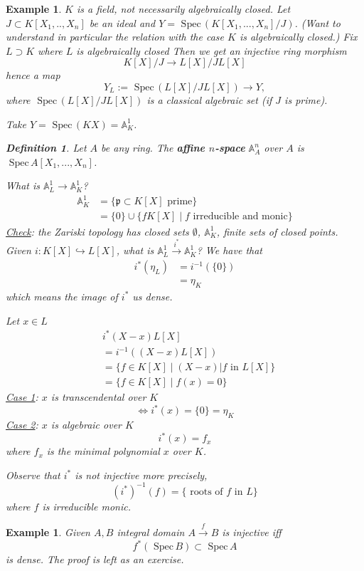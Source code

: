 \documentclass[11pt]{article}
\newtheorem{dfn}[thm]{Definition}
\newtheorem{ex}[thm]{Example}
\newcommand{\spec}{\text{ Spec}\,}
\newcommand{\affn}{\mathbb A}
\newcommand{\scp}{{\mathfrak p}}
\newcommand{\lrta}{\longrightarrow}
\newcommand{\Llrta}{\Longleftrightarrow}
\newcommand{\inj}{\hookrightarrow}
\begin{document}
\begin{ex}
$K$ is a field, not necessarily algebraically closed. Let $J\subset K[X_1,..,X_n]$ be an ideal and $Y=\spec (K[X_1,...,X_n]/J)$. (Want to understand in particular the relation with the case $K$ is algebraically closed.) Fix $L \supset K$  where $L$  is algebraically closed Then we get an injective ring morphism 
$$
K[X]/J\lrta L[X]/JL[X]
$$
hence a map
$$
Y_L:=\spec(L[X]/JL[X])\lrta Y,
$$
where $\spec(L[X]/JL[X])$ is a classical algebraic set (if $J$ is prime).

Take
$Y=\spec (K{X})=\affn^1_K$.

\begin{dfn}
	Let $A$ be any ring. The \textbf{affine $n$-space} $\affn^n_A$ over $A$ is $\spec A[X_1,...,X_n]$.
\end{dfn}
	
	


What is $\affn^1_L\lrta \affn^1_K$?
$$
\begin{aligned}
\affn^1_K&=\{\scp\subset K[X]\text{ prime}\}\\
&=\{0\} \cup \{fK[X]\mid f \text{ irreducible and monic}\}
\end{aligned}
$$
\underline{Check}: the Zariski topology has  closed sets $\emptyset$, $\affn^1_K$, finite sets of closed points. Given $i: K[X]\inj L[X]$, what is 
$\affn^1_L\overset{i^*}{\lrta }\affn^1_K$? We have that
$$
\begin{aligned}
i^*(\eta_L)&=i^{-1}(\{0\})\\
&= \eta_K
\end{aligned}
$$
which means the image of $i^*$ us dense.

Let $x\in L$
$$\begin{aligned}
&i^*(X-x)L[X]\\
&=i^{-1}((X-x)L[X])\\
&=\{f\in K[X]\mid (X-x)|f\text{ in } L[X]\}\\
&=\{f\in K[X]\mid f(x)=0\}
\end{aligned}
$$
\underline{Case 1}: $x$ is transcendental over $K$ 
$$
\Llrta i^*(x)=\{0\}=\eta_K
$$
\underline{Case 2}: $x$ is algebraic over $K$
$$
i^*(x)=f_x
$$
 where $f_x$ is the minimal polynomial $x$ over $K$.

 Observe that $i^*$ is not injective more precisely,
 $$
(i^*)^{-1}(f)=\{\text{ roots of $f$ in $L$}\}
 $$
 where $f$ is irreducible monic.
\end{ex}

\begin{ex}
Given $A,B$ integral domain 
$A\overset{f}{\lrta} B$ is injective iff
$$
f^{*}(\spec B)\subset \spec A
$$ is  dense. The proof is left as an exercise.

\end{ex}
\end{document}
